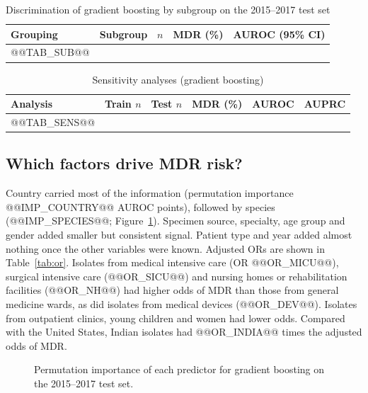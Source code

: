 \documentclass[11pt,a4paper]{article}
\begin{document}
\begin{table}[t]
\caption{Discrimination of gradient boosting by subgroup on the 2015--2017 test set}\label{tab:sub}
\centering\footnotesize
\begin{tabular}{llrrc}
\toprule
Grouping & Subgroup & $n$ & MDR (\%) & AUROC (95\% CI) \\
\midrule
@@TAB_SUB@@
\bottomrule
\end{tabular}
\end{table}

\begin{table}[t]
\caption{Sensitivity analyses (gradient boosting)}\label{tab:sens}
\centering\footnotesize
\begin{tabular}{lrrrcc}
\toprule
Analysis & Train $n$ & Test $n$ & MDR (\%) & AUROC & AUPRC \\
\midrule
@@TAB_SENS@@
\bottomrule
\end{tabular}
\end{table}

\subsection{Which factors drive MDR risk?}
Country carried most of the information (permutation importance @@IMP_COUNTRY@@ AUROC points), followed by species (@@IMP_SPECIES@@; Figure~\ref{fig:imp}). Specimen source, specialty, age group and gender added smaller but consistent signal. Patient type and year added almost nothing once the other variables were known. Adjusted ORs are shown in Table~\ref{tab:or}. Isolates from medical intensive care (OR @@OR_MICU@@), surgical intensive care (@@OR_SICU@@) and nursing homes or rehabilitation facilities (@@OR_NH@@) had higher odds of MDR than those from general medicine wards, as did isolates from medical devices (@@OR_DEV@@). Isolates from outpatient clinics, young children and women had lower odds. Compared with the United States, Indian isolates had @@OR_INDIA@@ times the adjusted odds of MDR.

\begin{figure}[t]
\centering
{}
\caption{Permutation importance of each predictor for gradient boosting on the 2015--2017 test set.}
\label{fig:imp}
\end{figure}
\end{document}
